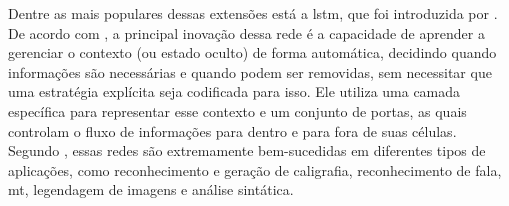
Dentre as mais populares dessas extensões está a \acrshort{lstm}, que foi introduzida por . De acordo com , a principal inovação dessa rede é a capacidade de aprender a gerenciar o contexto (ou estado oculto) de forma automática, decidindo quando informações são necessárias e quando podem ser removidas, sem necessitar que uma estratégia explícita seja codificada para isso. Ele utiliza uma camada específica para representar esse contexto e um conjunto de portas, as quais controlam o fluxo de informações para dentro e para fora de suas células.
Segundo , essas redes são extremamente bem-sucedidas em diferentes tipos de aplicações, como reconhecimento e geração de caligrafia, reconhecimento de fala, \acrfull{mt}, legendagem de imagens e análise sintática.


